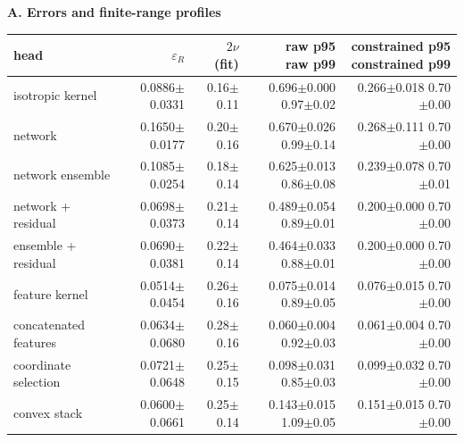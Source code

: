 \textbf{A. Errors and finite-range profiles}\par\medskip
{\fontsize{9}{11}\selectfont
\setlength{\tabcolsep}{3pt}
\begin{tabular}{lrrrr}
\toprule
head & $\varepsilon_R$ & $2\nu$ (fit) & \thead{raw p95\\raw p99} & \thead{constrained p95\\constrained p99} \\
\midrule
isotropic kernel & 0.0886$\pm$0.0331 & 0.16$\pm$0.11 & \shortstack{0.696$\pm$0.000\\0.97$\pm$0.02} & \shortstack{0.266$\pm$0.018\\0.70$\pm$0.00} \\
network & 0.1650$\pm$0.0177 & 0.20$\pm$0.16 & \shortstack{0.670$\pm$0.026\\0.99$\pm$0.14} & \shortstack{0.268$\pm$0.111\\0.70$\pm$0.00} \\
network ensemble & 0.1085$\pm$0.0254 & 0.18$\pm$0.14 & \shortstack{0.625$\pm$0.013\\0.86$\pm$0.08} & \shortstack{0.239$\pm$0.078\\0.70$\pm$0.01} \\
network + residual & 0.0698$\pm$0.0373 & 0.21$\pm$0.14 & \shortstack{0.489$\pm$0.054\\0.89$\pm$0.01} & \shortstack{0.200$\pm$0.000\\0.70$\pm$0.00} \\
ensemble + residual & 0.0690$\pm$0.0381 & 0.22$\pm$0.14 & \shortstack{0.464$\pm$0.033\\0.88$\pm$0.01} & \shortstack{0.200$\pm$0.000\\0.70$\pm$0.00} \\
feature kernel & 0.0514$\pm$0.0454 & 0.26$\pm$0.16 & \shortstack{0.075$\pm$0.014\\0.89$\pm$0.05} & \shortstack{0.076$\pm$0.015\\0.70$\pm$0.00} \\
concatenated features & 0.0634$\pm$0.0680 & 0.28$\pm$0.16 & \shortstack{0.060$\pm$0.004\\0.92$\pm$0.03} & \shortstack{0.061$\pm$0.004\\0.70$\pm$0.00} \\
coordinate selection & 0.0721$\pm$0.0648 & 0.25$\pm$0.15 & \shortstack{0.098$\pm$0.031\\0.85$\pm$0.03} & \shortstack{0.099$\pm$0.032\\0.70$\pm$0.00} \\
convex stack & 0.0600$\pm$0.0661 & 0.25$\pm$0.14 & \shortstack{0.143$\pm$0.015\\1.09$\pm$0.05} & \shortstack{0.151$\pm$0.015\\0.70$\pm$0.00} \\
\bottomrule
\end{tabular}}
